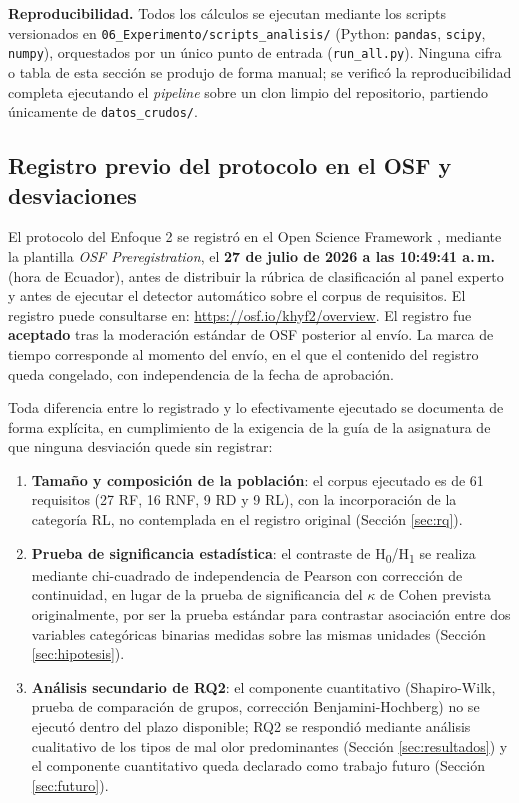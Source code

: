 \documentclass[journal,onecolumn]{IEEEtran}
\begin{document}
\textbf{Reproducibilidad.} Todos los cálculos se ejecutan mediante los
scripts versionados en \texttt{06\_Experimento/scripts\_analisis/} (Python:
\texttt{pandas}, \texttt{scipy}, \texttt{numpy}), orquestados por un único
punto de entrada (\texttt{run\_all.py}). Ninguna cifra o tabla de esta
sección se produjo de forma manual; se verificó la reproducibilidad
completa ejecutando el \emph{pipeline} sobre un clon limpio del
repositorio, partiendo únicamente de \texttt{datos\_crudos/}.

\subsection{Registro previo del protocolo en el OSF y desviaciones}
\label{sec:osf}

El protocolo del Enfoque 2 se registró en el Open Science Framework
\cite{nosek2018}, mediante la plantilla \emph{OSF Preregistration}, el
\textbf{27 de julio de 2026 a las 10:49:41 a.\,m.} (hora de Ecuador), antes
de distribuir la rúbrica de clasificación al panel experto y antes de
ejecutar el detector automático sobre el corpus de requisitos. El registro
puede consultarse en:
\url{https://osf.io/khyf2/overview}.
El registro fue \textbf{aceptado} tras la moderación estándar de OSF
posterior al envío. La marca de tiempo corresponde al momento del envío, en
el que el contenido del registro queda congelado, con independencia de la
fecha de aprobación.

Toda diferencia entre lo registrado y lo efectivamente ejecutado se
documenta de forma explícita, en cumplimiento de la exigencia de la guía de
la asignatura de que ninguna desviación quede sin registrar:

\begin{enumerate}[leftmargin=*]
	\item \textbf{Tamaño y composición de la población}: el corpus ejecutado
	es de 61 requisitos (27 RF, 16 RNF, 9 RD y 9 RL), con la incorporación de
	la categoría RL, no contemplada en el registro original
	(Sección \ref{sec:rq}).
	\item \textbf{Prueba de significancia estadística}: el contraste de
	H\textsubscript{0}/H\textsubscript{1} se realiza mediante chi-cuadrado de
	independencia de Pearson con corrección de continuidad, en lugar de la
	prueba de significancia del $\kappa$ de Cohen prevista originalmente, por
	ser la prueba estándar para contrastar asociación entre dos variables
	categóricas binarias medidas sobre las mismas unidades
	(Sección \ref{sec:hipotesis}).
	\item \textbf{Análisis secundario de RQ2}: el componente cuantitativo
	(Shapiro-Wilk, prueba de comparación de grupos, corrección
	Benjamini-Hochberg) no se ejecutó dentro del plazo disponible; RQ2 se
	respondió mediante análisis cualitativo de los tipos de mal olor
	predominantes (Sección \ref{sec:resultados}) y el componente cuantitativo
	queda declarado como trabajo futuro (Sección \ref{sec:futuro}).
\end{enumerate}
\end{document}
